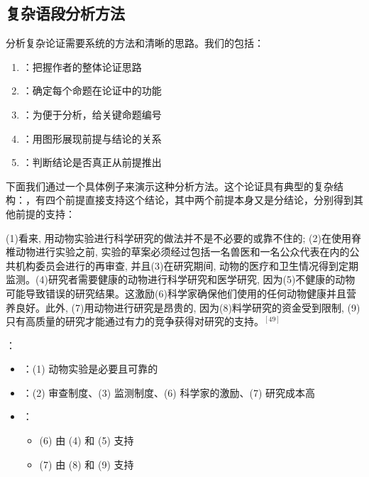 \subsection{复杂语段分析方法}

分析复杂论证需要系统的方法和清晰的思路。我们的包括：

\begin{theorembox}[title=复杂论证分析步骤]
\begin{enumerate}
  \item {}：把握作者的整体论证思路
  \item {}：确定每个命题在论证中的功能
  \item {}：为便于分析，给关键命题编号
  \item {}：用图形展现前提与结论的关系
  \item {}：判断结论是否真正从前提推出
\end{enumerate}
\end{theorembox}

下面我们通过一个具体例子来演示这种分析方法。这个论证具有典型的复杂结构：，有四个前提直接支持这个结论，其中两个前提本身又是分结论，分别得到其他前提的支持：

\begin{displayquote}
(1)看来, 用动物实验进行科学研究的做法并不是不必要的或靠不住的; (2)在使用脊椎动物进行实验之前, 实验的草案必须经过包括一名兽医和一名公众代表在内的公共机构委员会进行的再审查, 并且(3)在研究期间, 动物的医疗和卫生情况得到定期监测。(4)研究者需要健康的动物进行科学研究和医学研究, 因为(5)不健康的动物可能导致错误的研究结果。这激励(6)科学家确保他们使用的任何动物健康并且营养良好。此外, (7)用动物进行研究是昂贵的, 因为(8)料学研究的资金受到限制, (9)只有高质量的研究才能通过有力的竞争获得对研究的支持。$^{[49]}$
\end{displayquote}

\begin{examplebox}[title=动物实验论证的结构分析]
：
\begin{itemize}
  \item {}：(1) 动物实验是必要且可靠的
  \item {}：(2) 审查制度、(3) 监测制度、(6) 科学家的激励、(7) 研究成本高
  \item {}：
    \begin{itemize}
      \item (6) 由 (4) 和 (5) 支持
      \item (7) 由 (8) 和 (9) 支持
    \end{itemize}
\end{itemize}
\end{examplebox}

